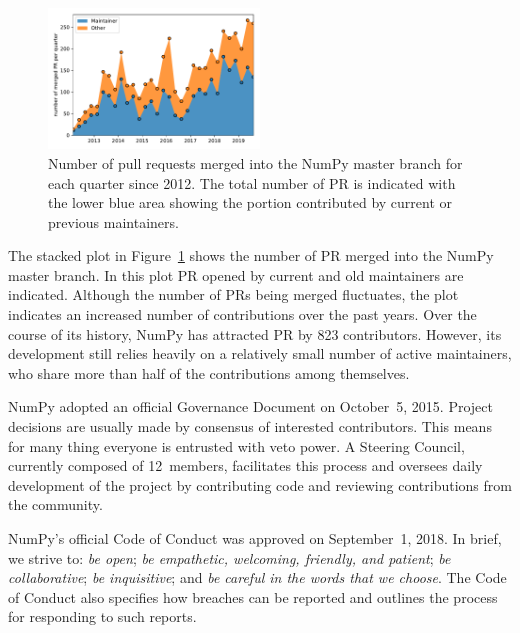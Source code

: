 \begin{figure}
    \centering
    \includegraphics[width=0.5\textwidth]{scripts/PRs-using-CURRENT_MAINTAINERS.pdf}
    \caption{Number of pull requests merged into the NumPy master branch for each
        quarter since 2012. The total number of PR is indicated with the
        lower blue area showing the portion contributed by current or previous
        maintainers.}\label{fig:prs-over-time}
\end{figure}

The stacked plot in Figure~\ref{fig:prs-over-time} shows the number of
PR merged into the NumPy master branch.
In this plot PR opened by current and old maintainers are indicated.
Although the number of PRs being merged fluctuates,
the plot indicates an increased number of contributions over the past
years.
Over the course of its history, NumPy has attracted PR by 823 contributors.
However, its development still relies heavily on a relatively small number
of active maintainers, who share more than half of the contributions among
themselves.

NumPy adopted an official Governance Document on October~5,
2015\cite{NumPyProjectGovernance}.
Project decisions are usually made by consensus of interested contributors.
This means for many thing everyone is entrusted with veto power.
A Steering Council, currently composed of 12~members, facilitates this
process and oversees daily development of the project by contributing code
and reviewing contributions from the community.

NumPy's official Code of Conduct was approved on September~1, 2018\cite{NumPyCodeofConduct}.
In brief, we strive to:
\emph{be open};
\emph{be empathetic, welcoming, friendly, and patient};
\emph{be collaborative};
\emph{be inquisitive}; and
\emph{be careful in the words that we choose}.
The Code of Conduct also specifies how breaches can be reported and outlines
the process for responding to such reports.


